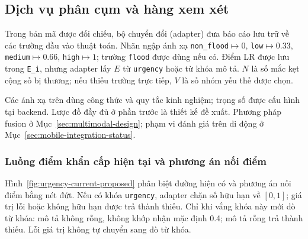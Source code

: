 

\subsection{Dịch vụ phân cụm và hàng xem xét}
Trong bản mã được đối chiếu, bộ chuyển đổi (adapter) đưa báo cáo lưu trữ về các trường đầu vào thuật toán. Nhãn ngập ánh xạ \texttt{non\_flood}$\mapsto0$, \texttt{low}$\mapsto0.33$, \texttt{medium}$\mapsto0.66$, \texttt{high}$\mapsto1$; trường \texttt{flood} được dùng nếu có. Điểm LR được lưu trong \texttt{E\_i}, nhưng adapter lấy $E$ từ \texttt{urgency} hoặc từ khóa mô tả. $N$ là số mắc kẹt cộng số bị thương; nếu thiếu trường trực tiếp, $V$ là số nhóm yếu thế được chọn.

Các ánh xạ trên dùng công thức và quy tắc kinh nghiệm; trọng số được cấu hình tại backend. Lược đồ đầy đủ ở phần trước là thiết kế đề xuất. Phương pháp fusion ở Mục~\ref{sec:multimodal-design}; phạm vi đánh giá trên di động ở Mục~\ref{sec:mobile-integration-status}.

\subsubsection{Luồng điểm khẩn cấp hiện tại và phương án nối điểm}
Hình~\ref{fig:urgency-current-proposed} phân biệt đường hiện có và phương án nối điểm bằng nét đứt. Nếu có khóa \texttt{urgency}, adapter chặn số hữu hạn về $[0,1]$; giá trị lỗi hoặc không hữu hạn được trả thành thiếu. Chỉ khi vắng khóa này mới dò từ khóa: mô tả không rỗng, không khớp nhận mặc định 0.4; mô tả rỗng trả thành thiếu. Lỗi giá trị không tự chuyển sang dò từ khóa.

